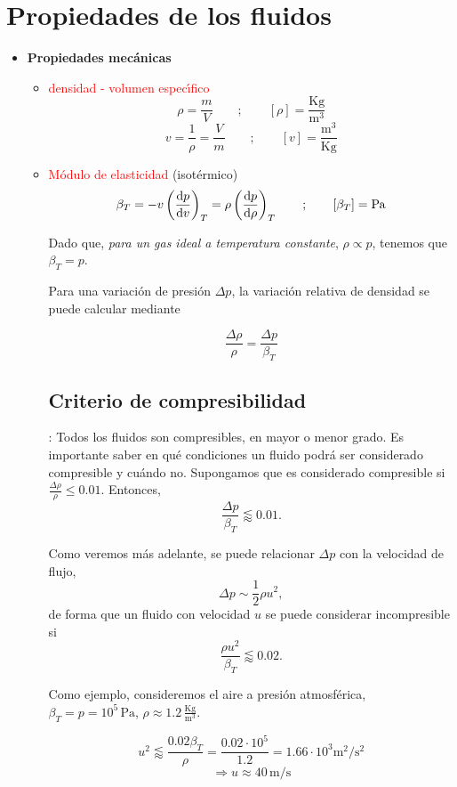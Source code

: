 \section{Propiedades de los fluidos}
\begin{itemize}
	\item \textbf{Propiedades mec\'anicas}
	\begin{itemize}
		\item{\textcolor{red}{densidad - volumen espec\'{\i}fico}}
		$$
		\rho = \frac{m}{V} \qquad ; \qquad \left[\rho\right] = \frac{\textrm{Kg}}{\textrm{m}^3}
		$$
		$$
		v = \frac{1}{\rho} = \frac{V}{m} \qquad ; \qquad \left[v\right] = \frac{\textrm{m}^3}{\textrm{Kg}}
		$$
		\item{\textcolor{red}{M\'odulo de elasticidad} (isot\'ermico)}
		$$
		\beta_T = -v \left(\frac{\textrm{d} p}{\textrm{d} v}\right)_T = \rho \left(\frac{\textrm{d} p}{\textrm{d} \rho}\right)_T \qquad ; \qquad \left[\beta_T\right] = \textrm{Pa}
		$$
		
		Dado que, \textit{para un gas ideal a temperatura constante}, $\rho \propto p$, tenemos que $\beta_T = p$.
		
		Para una variaci\'on de presi\'on $\Delta p$, la variaci\'on relativa de densidad se puede calcular mediante
		
		$$
		\frac{\Delta \rho}{\rho} = \frac{\Delta p}{\beta_T}
		$$
		
		
		
			\subsection*{Criterio de compresibilidad} : Todos los fluidos son compresibles, en mayor o menor grado.
			Es importante saber en qu\'e condiciones  un fluido podr\'a ser considerado compresible y cu\'ando no. Supongamos que es considerado compresible si $\frac{\Delta \rho}{\rho} \leq 0.01$. Entonces,
			$$
			\frac{\Delta p}{\beta_T} \lessapprox 0.01.
			$$
			
			Como veremos m\'as adelante, se puede relacionar $\Delta p$ con la velocidad de flujo,
			$$
			\Delta p \sim \frac{1}{2} \rho u^2,
			$$
			de forma que un fluido con velocidad $u$ se puede considerar incompresible si
			$$
			\frac{\rho u^2}{\beta_T} \lessapprox 0.02.
			$$
			
			Como ejemplo, consideremos el aire a presi\'on atmosf\'erica, $ \beta_T = p = 10^5 \,\textrm{Pa}$,
			$\rho \approx 1.2 \,\frac{\textrm{Kg}}{\textrm{m}^3}$.
			
			$$ u^2 \lessapprox \frac{0.02 \beta_T}{\rho} = \frac{0.02 \cdot 10^5}{1.2} = 1.66 \cdot 10^3 \textrm{m}^2/\textrm{s}^2$$
			$$ \Rightarrow u \approx 40 \, \textrm{m/s} $$
			

\end{itemize}
\end{itemize}
